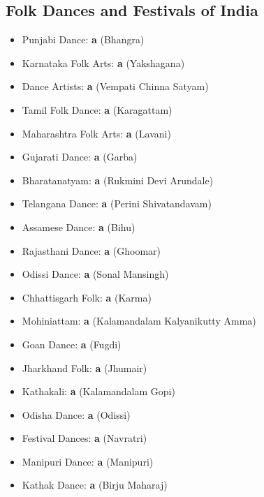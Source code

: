 \documentclass[12pt,a4paper]{book}
\begin{document}
\subsection{Folk Dances and Festivals of India}
\begin{itemize}
\item Punjabi Dance: \textbf{a} (Bhangra)
\item Karnataka Folk Arts: \textbf{a} (Yakshagana)
\item Dance Artists: \textbf{a} (Vempati Chinna Satyam)
\item Tamil Folk Dance: \textbf{a} (Karagattam)
\item Maharashtra Folk Arts: \textbf{a} (Lavani)
\item Gujarati Dance: \textbf{a} (Garba)
\item Bharatanatyam: \textbf{a} (Rukmini Devi Arundale)
\item Telangana Dance: \textbf{a} (Perini Shivatandavam)
\item Assamese Dance: \textbf{a} (Bihu)
\item Rajasthani Dance: \textbf{a} (Ghoomar)
\item Odissi Dance: \textbf{a} (Sonal Mansingh)
\item Chhattisgarh Folk: \textbf{a} (Karma)
\item Mohiniattam: \textbf{a} (Kalamandalam Kalyanikutty Amma)
\item Goan Dance: \textbf{a} (Fugdi)
\item Jharkhand Folk: \textbf{a} (Jhumair)
\item Kathakali: \textbf{a} (Kalamandalam Gopi)
\item Odisha Dance: \textbf{a} (Odissi)
\item Festival Dances: \textbf{a} (Navratri)
\item Manipuri Dance: \textbf{a} (Manipuri)
\item Kathak Dance: \textbf{a} (Birju Maharaj)
\end{itemize}
\end{document}
